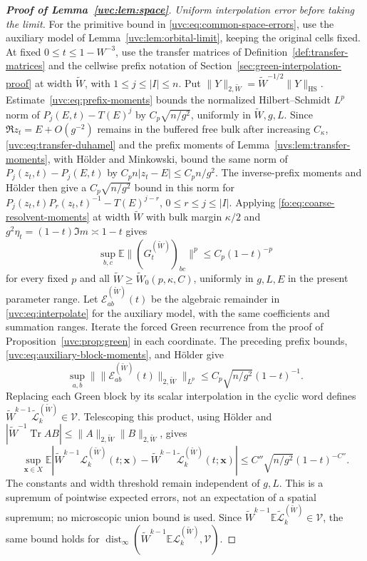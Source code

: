 \documentclass[11pt]{article}
\numberwithin{equation}{section}
\theoremstyle{remark}
\newcommand{\E}{\mathbb E}
\newcommand{\Tr}{\operatorname{Tr}}
\newcommand{\wt}{\widetilde}
\newcommand{\cL}{\mathcal L}
\begin{document}
\begin{proof}[\textbf{Proof of Lemma~\ref{uvc:lem:space}}]
\smallskip\noindent\emph{Uniform interpolation error before taking the limit.}
For the primitive bound in \eqref{uvc:eq:common-space-errors}, use the
auxiliary model of Lemma~\ref{uvc:lem:orbital-limit}, keeping the original
cells fixed. At fixed $0\le t\le1-W^{-3}$, use the transfer matrices of
Definition~\ref{def:transfer-matrices} and the cellwise prefix notation of
Section~\ref{sec:green-interpolation-proof} at width $\wt W$, with
$1\le j\le |I|\le n$. Put
$\|Y\|_{2,\wt W}=\wt W^{-1/2}\|Y\|_{\mathrm{HS}}$.
Estimate~\eqref{uvc:eq:prefix-moments} bounds the normalized Hilbert--Schmidt
$L^p$ norm of $P_j(E,t)-T(E)^j$ by $C_p\sqrt{n/g^2}$,
uniformly in $\wt W,g,L$.
Since $\Re z_t=E+O(g^{-2})$ remains in the buffered free bulk after
increasing $C_\kappa$, \eqref{uvc:eq:transfer-duhamel} and the prefix moments
of Lemma~\ref{uvs:lem:transfer-moments}, with H\"older and Minkowski, bound
the same norm of $P_j(z_t,t)-P_j(E,t)$ by
$C_p n|z_t-E|\le C_p n/g^2$.
The inverse-prefix moments and H\"older then give a
$C_p\sqrt{n/g^2}$ bound in this norm for
$P_j(z_t,t)P_r(z_t,t)^{-1}-T(E)^{j-r}$, $0\le r\le j\le |I|$.
Applying \eqref{fo:eq:coarse-resolvent-moments} at width $\wt W$ with
bulk margin $\kappa/2$ and $g^2\eta_t=(1-t)\Im m\asymp1-t$ gives
\begin{equation}\label{uvc:eq:auxiliary-block-moments}
 \sup_{b,c}\E\|(G_t^{(\wt W)})_{bc}\|^p\le C_p(1-t)^{-p}
\end{equation}
for every fixed $p$ and all $\wt W\ge \wt W_0(p,\kappa,C)$, uniformly in
$g,L,E$ in the present parameter range.
Let $\mathcal E_{ab}^{(\wt W)}(t)$ be the algebraic remainder in
\eqref{uvc:eq:interpolate} for the auxiliary model, with the same
coefficients and summation ranges. Iterate the forced Green recurrence
from the proof of Proposition~\ref{uvc:prop:green} in each coordinate.
The preceding prefix bounds, \eqref{uvc:eq:auxiliary-block-moments}, and
H\"older give
\[
 \sup_{a,b}\bigl\|\|\mathcal E_{ab}^{(\wt W)}(t)\|_{2,\wt W}\bigr\|_{L^p}
 \le C_p\sqrt{n/g^2}(1-t)^{-1}.
\]
Replacing each Green block by its
scalar interpolation in the cyclic word defines
$\wt W^{k-1}\widetilde{\cL}_k^{(\wt W)}\in\mathcal V$.
Telescoping this product, using H\"older and
$|\wt W^{-1}\Tr AB|\le\|A\|_{2,\wt W}\|B\|_{2,\wt W}$, gives
\[
 \sup_{\boldsymbol x\in X}
 \E|\wt W^{k-1}\cL_k^{(\wt W)}(t;\boldsymbol x)
       -\wt W^{k-1}\widetilde{\cL}_k^{(\wt W)}(t;\boldsymbol x)|
 \le C''\sqrt{n/g^2}(1-t)^{-C''}.
\]
The constants and width threshold remain independent of $g,L$.
This is a supremum of pointwise expected errors, not an expectation
of a spatial supremum; no microscopic union bound is used.
Since $\wt W^{k-1}\E\widetilde{\cL}_k^{(\wt W)}\in\mathcal V$,
the same bound holds for
$\operatorname{dist}_\infty(\wt W^{k-1}\E\cL_k^{(\wt W)},\mathcal V)$.


\end{proof}
\end{document}
